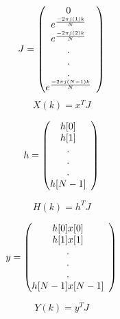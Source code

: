 \documentclass[journal,12pt,twocolumn]{IEEEtran}
\renewcommand\thesection{\arabic{section}}
\begin{document}
\begin{enumerate}[label=\thesection.\arabic*]
\[
\begin{array}{lc}
    J = 
  \left(\begin{array}{@{}ccc@{}}
    0 \\
    e^{\frac{-2\pi j(1)k}{N}} \\
    e^{\frac{-2\pi j(2)k}{N}} \\
    . \\
    . \\
    . \\
    e^{\frac{-2\pi j(N-1)k}{N}} \\
  \end{array}\right) \\[15pt]
\end{array}
\]
\begin{equation}
    X(k) = x^{T} J
\end{equation}

\[
\begin{array}{lc}
    h = 
  \left(\begin{array}{@{}ccc@{}}
    h[0] \\
    h[1] \\
    . \\
    . \\
    . \\
    h[N-1] \\
  \end{array}\right) \\[15pt]
\end{array}
\]

\begin{equation}
    H(k) = h^{T} J
\end{equation}

\[
\begin{array}{lc}
    y = 
  \left(\begin{array}{@{}ccc@{}}
    h[0] x[0] \\
    h[1] x[1] \\
    . \\
    . \\
    . \\
    h[N-1] x[N-1] \\
  \end{array}\right) \\[15pt]
\end{array}
\]

\begin{equation}
    Y(k) = y^{T} J
\end{equation}

\end{enumerate}
%
\end{document}
